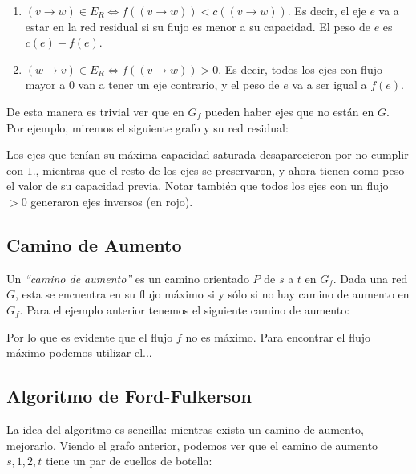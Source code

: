 \begin{enumerate}
\item $(v \rightarrow w) \in E_R \Longleftrightarrow f((v \rightarrow w)) < c((v \rightarrow w))$. Es decir, el eje $e$ va a estar en la red residual si su flujo es menor a su capacidad. El peso de $e$ es $c(e) - f(e)$.
\item $(w \rightarrow v) \in E_R \Longleftrightarrow f((v \rightarrow w)) > 0$. Es decir, todos los ejes con flujo mayor a $0$ van a tener un eje contrario, y el peso de $e$ va a ser igual a $f(e)$.
\end{enumerate}



De esta manera es trivial ver que en $G_f$ pueden haber ejes que no est\'an en $G$. Por ejemplo, miremos el siguiente grafo y su red residual:

\begin{figure}[htb]
    \centering
    
\end{figure}

Los ejes que ten\'ian su m\'axima capacidad saturada desaparecieron por no cumplir con $1.$, mientras que el resto de los ejes se preservaron, y ahora tienen como peso el valor de su capacidad previa. Notar tambi\'en que todos los ejes con un flujo $>0$ generaron ejes inversos (en rojo).


\newpage
\subsection{Camino de Aumento}

Un \emph{``camino de aumento''} es un camino orientado $P$ de $s$ a $t$ en $G_f$. Dada una red $G$, esta se encuentra en su flujo m\'aximo si y s\'olo si no hay camino de aumento en $G_f$. Para el ejemplo anterior tenemos el siguiente camino de aumento:

\begin{figure}[htb]
    \centering
    
\end{figure}

Por lo que es evidente que el flujo $f$ no es m\'aximo. Para encontrar el flujo m\'aximo podemos utilizar el...

\subsection{Algoritmo de Ford-Fulkerson}

La idea del algoritmo es sencilla: mientras exista un camino de aumento, mejorarlo. Viendo el grafo anterior, podemos ver que el camino de aumento $s,1,2,t$ tiene un par de cuellos de botella:

